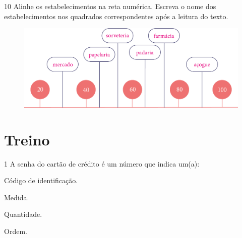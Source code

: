 
\pagebreak
\num{10} Alinhe os estabelecimentos na reta numérica. Escreva o nome dos
estabelecimentos nos quadrados correspondentes após a leitura do texto.

\begin{figure}[htpb!]
\includegraphics[width=\textwidth]{./media/image14.png}
\end{figure}





\section*{Treino}

\num{1} A senha do cartão de crédito é um número que indica um(a):

\begin{escolha}[itemsep=-5pt]
\item Código de identificação.

\item Medida.

\item Quantidade.

\item Ordem.
\end{escolha}


